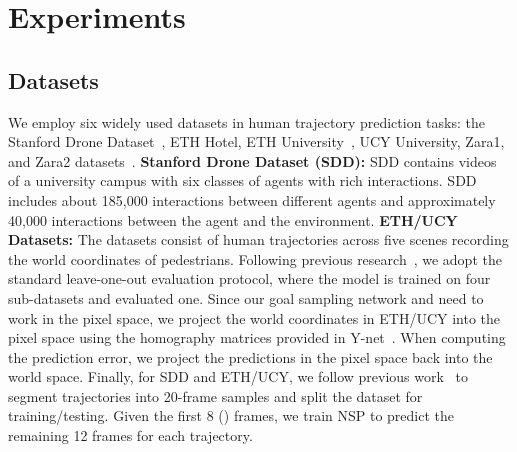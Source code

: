 \documentclass[runningheads]{llncs}
\begin{document}
\section{Experiments}
 
\subsection{Datasets}

We employ six widely used datasets in human trajectory prediction tasks: the Stanford Drone Dataset~\cite{robicquet2016learning}, ETH Hotel, ETH University~\cite{pellegrini2010improving}, UCY University, Zara1, and Zara2 datasets~\cite{lerner2007crowds}. \textbf{Stanford Drone Dataset (SDD):} SDD contains videos of a university campus with six classes of agents with rich interactions. SDD includes about 185,000 interactions between different agents and approximately 40,000 interactions between the agent and the environment. \textbf{ETH/UCY Datasets:} The datasets consist of human trajectories across five scenes recording the world coordinates of pedestrians. Following previous research~\cite{mangalam2021goals,mangalam2020not}, we adopt the standard leave-one-out evaluation protocol, where the model is trained on four sub-datasets and evaluated one. Since our goal sampling network and  need to work in the pixel space, we project the world coordinates in ETH/UCY into the pixel space using the homography matrices provided in Y-net~\cite{mangalam2021goals}. When computing the prediction error, we project the predictions in the pixel space back into the world space. Finally, for SDD and ETH/UCY, we follow previous work~\cite{mangalam2021goals,sadeghian2018trajnet} to segment trajectories into 20-frame samples and split the dataset for training/testing. Given the first 8 () frames, we train NSP to predict the remaining 12 frames for each trajectory.
\end{document}
